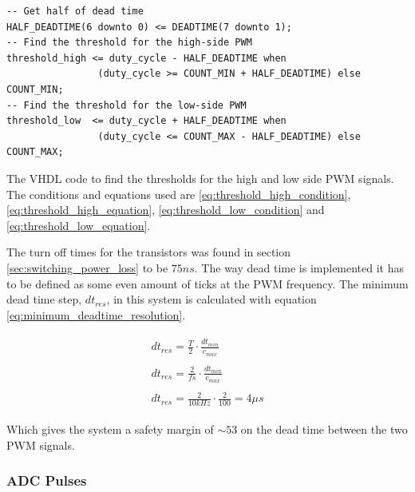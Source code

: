 \begin{verbatim}
-- Get half of dead time
HALF_DEADTIME(6 downto 0) <= DEADTIME(7 downto 1);
-- Find the threshold for the high-side PWM
threshold_high <= duty_cycle - HALF_DEADTIME when 
                (duty_cycle >= COUNT_MIN + HALF_DEADTIME) else COUNT_MIN;
-- Find the threshold for the low-side PWM
threshold_low  <= duty_cycle + HALF_DEADTIME when 
                (duty_cycle <= COUNT_MAX - HALF_DEADTIME) else COUNT_MAX;
\end{verbatim}
\begin{center}
    The VHDL code to find the thresholds for the high and low side PWM signals. The conditions and equations used are \ref{eq:threshold_high_condition}, \ref{eq:threshold_high_equation}, \ref{eq:threshold_low_condition} and \ref{eq:threshold_low_equation}.
\end{center}



The turn off times for the transistors was found in section \ref{sec:switching_power_loss} to be $75ns$.
The way dead time is implemented it has to be defined as some even amount of ticks at the PWM frequency.
The minimum dead time step, $dt_{res}$, in this system is calculated with equation \ref{eq:minimum_deadtime_resolution}.

\begin{subequations}
    \begin{align}
        \begin{split}
            dt_{res} = \frac{T}{2} \cdot \frac{dt_{min}}{c_{max}}
        \end{split} \\ 
        \begin{split}
             dt_{res} = \frac{2}{fs} \cdot \frac{dt_{min}}{c_{max}}
        \end{split} \\ 
        \begin{split}
             dt_{res} = \frac{2}{10kHz} \cdot \frac{2}{100} = 4\mu s
        \end{split} 
    \end{align}
    \label{eq:minimum_deadtime_resolution}
\end{subequations}

Which gives the system a safety margin of $\sim 53$ on the dead time between the two PWM signals.


\subsubsection*{ADC Pulses}


